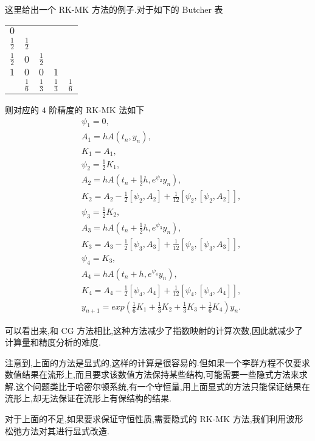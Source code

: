 这里给出一个 RK-MK 方法的例子.对于如下的 Butcher 表
\begin{center}
  \begin{tabular}{c|cccc}
    $0$&&&&\\
    $\frac{1}{2}$&$\frac{1}{2}$&&&\\
    $\frac{1}{2}$&$0$&$\frac{1}{2}$&&\\
    $1$&$0$&$0$&$1$&\\
    \hline
         &$\frac{1}{6}$&$\frac{1}{3}$&$\frac{1}{3}$&$\frac{1}{6}$
  \end{tabular}
\end{center}

则对应的 $4$ 阶精度的 RK-MK 法如下
\begin{equation*}
	\begin{aligned}
		&\psi_1=0,\\
		&A_1=hA(t_n,y_n),\\
		&K_1=A_1,\\
		&\psi_2=\frac{1}{2}K_1,\\
		&A_2=hA(t_n+\frac{1}{2}h,e^{\psi_2}y_n),\\
		&K_2=A_2-\frac{1}{2}[\psi_2,A_2]+\frac{1}{12}[\psi_2,[\psi_2,A_2]],\\
		&\psi_3=\frac{1}{2}K_2,\\
		&A_3=hA(t_n+\frac{1}{2}h,e^{\psi_3}y_n),\\
		&K_3=A_3-\frac{1}{2}[\psi_3,A_3]+\frac{1}{12}[\psi_3,[\psi_3,A_3]],\\
		&\psi_4=K_3,\\
		&A_4=hA(t_n+h,e^{\psi_4}y_n),\\
		&K_4=A_4-\frac{1}{2}[\psi_4,A_4]+\frac{1}{12}[\psi_4,[\psi_4,A_4]],\\
		&y_{n+1}=exp(\frac{1}{6}K_1+\frac{1}{3}K_2+\frac{1}{3}K_3+\frac{1}{6}K_4)y_n.
	\end{aligned}
\end{equation*}

可以看出来,和 CG 方法相比,这种方法减少了指数映射的计算次数,因此就减少了计算量和精度分析的难度.

注意到,上面的方法是显式的,这样的计算是很容易的.但如果一个李群方程不仅要求数值结果在流形上,而且要求该数值方法保持某些结构,可能需要一些隐式方法来求解.这个问题类比于哈密尔顿系统,有一个守恒量,用上面显式的方法只能保证结果在流形上,却无法保证在流形上有保结构的结果.

对于上面的不足,如果要求保证守恒性质,需要隐式的 RK-MK 方法,我们利用波形松弛方法对其进行显式改造.


